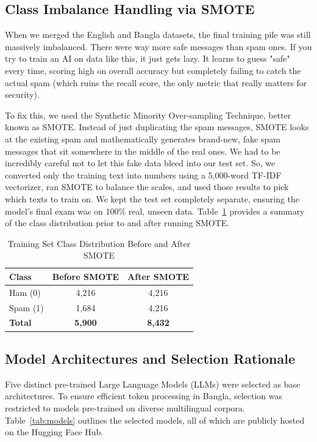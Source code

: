 \documentclass[journal]{IEEEtran}
\begin{document}
\subsection{Class Imbalance Handling via SMOTE}

When we merged the English and Bangla datasets, the final training pile was still massively imbalanced. There were way more safe messages than spam ones. If you try to train an AI on data like this, it just gets lazy. It learns to guess "safe" every time, scoring high on overall accuracy but completely failing to catch the actual spam (which ruins the recall score, the only metric that really matters for security).

To fix this, we used the Synthetic Minority Over-sampling Technique, better known as SMOTE. Instead of just duplicating the spam messages, SMOTE looks at the existing spam and mathematically generates brand-new, fake spam messages that sit somewhere in the middle of the real ones. We had to be incredibly careful not to let this fake data bleed into our test set. So, we converted only the training text into numbers using a 5,000-word TF-IDF vectorizer, ran SMOTE to balance the scales, and used those results to pick which texts to train on. We kept the test set completely separate, ensuring the model's final exam was on 100\% real, unseen data. Table~\ref{tab:smote} provides a summary
of the class distribution prior to and after running SMOTE.

\begin{table}[htbp]
\caption{Training Set Class Distribution Before and After SMOTE}
\label{tab:smote}
\centering
\begin{tabular}{lcc}
\toprule
\textbf{Class} & \textbf{Before SMOTE} & \textbf{After SMOTE} \\
\midrule
Ham (0) & 4,216 & 4,216 \\
Spam (1) & 1,684 & 4,216 \\
\textbf{Total} & \textbf{5,900} & \textbf{8,432} \\
\bottomrule
\end{tabular}
\end{table}

\subsection{Model Architectures and Selection Rationale}

Five distinct pre-trained Large Language Models (LLMs) were selected as base architectures. To ensure efficient token processing in Bangla, selection was restricted to models pre-trained on diverse multilingual corpora. Table~\ref{tab:models} outlines the selected models, all of which are publicly hosted on the Hugging Face Hub.
\end{document}
